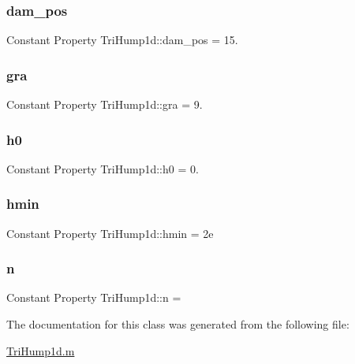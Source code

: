 \subsubsection{\texorpdfstring{dam\+\_\+pos}{dam\_pos}}
{\footnotesize\ttfamily Constant Property Tri\+Hump1d\+::dam\+\_\+pos = 15.}

\mbox{\label{class_tri_hump1d_a9dc1850d97e4254d36784c1cc2dc268d}} 
\subsubsection{\texorpdfstring{gra}{gra}}
{\footnotesize\ttfamily Constant Property Tri\+Hump1d\+::gra = 9.}

\mbox{\label{class_tri_hump1d_a001155d8fb406c12bc2fa30d3a940a88}} 
\subsubsection{\texorpdfstring{h0}{h0}}
{\footnotesize\ttfamily Constant Property Tri\+Hump1d\+::h0 = 0.}

\mbox{\label{class_tri_hump1d_a84db38e27b4daba3eb1115d2f59b5591}} 
\subsubsection{\texorpdfstring{hmin}{hmin}}
{\footnotesize\ttfamily Constant Property Tri\+Hump1d\+::hmin = 2e}

\mbox{\label{class_tri_hump1d_a8c2abb8b74705baf17f0969dfb2c200b}} 
\subsubsection{\texorpdfstring{n}{n}}
{\footnotesize\ttfamily Constant Property Tri\+Hump1d\+::n =}



The documentation for this class was generated from the following file\+:\begin{DoxyCompactItemize}
\item 
\hyperlink{_tri_hump1d_8m}{Tri\+Hump1d.\+m}\end{DoxyCompactItemize}
